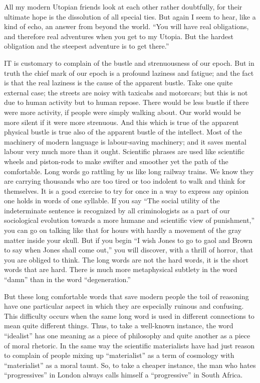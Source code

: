 All my modern Utopian friends look at each other rather doubtfully, for their ultimate hope is the dissolution of all special ties. But again I seem to hear, like a kind of echo, an answer from beyond the world. “You will have real obligations, and therefore real adventures when you get to my Utopia. But the hardest obligation and the steepest adventure is to get there.”


IT is customary to complain of the bustle and strenuousness of our epoch. But in truth the chief mark of our epoch is a profound laziness and fatigue; and the fact is that the real laziness is the cause of the apparent bustle. Take one quite external case; the streets are noisy with taxicabs and motorcars; but this is not due to human activity but to human repose. There would be less bustle if there were more activity, if people were simply walking about. Our world would be more silent if it were more strenuous. And this which is true of the apparent physical bustle is true also of the apparent bustle of the intellect. Most of the machinery of modern language is labour-saving machinery; and it saves mental labour very much more than it ought. Scientific phrases are used like scientific wheels and piston-rods to make swifter and smoother yet the path of the comfortable. Long words go rattling by us like long railway trains. We know they are carrying thousands who are too tired or too indolent to walk and think for themselves. It is a good exercise to try for once in a way to express any opinion one holds in words of one syllable. If you say “The social utility of the indeterminate sentence is recognized by all criminologists as a part of our sociological evolution towards a more humane and scientific view of punishment,” you can go on talking like that for hours with hardly a movement of the gray matter inside your skull. But if you begin “I wish Jones to go to gaol and Brown to say when Jones shall come out,” you will discover, with a thrill of horror, that you are obliged to think. The long words are not the hard words, it is the short words that are hard. There is much more metaphysical subtlety in the word “damn” than in the word “degeneration.”

But these long comfortable words that save modern people the toil of reasoning have one particular aspect in which they are especially ruinous and confusing. This difficulty occurs when the same long word is used in different connections to mean quite different things. Thus, to take a well-known instance, the word “idealist” has one meaning as a piece of philosophy and quite another as a piece of moral rhetoric. In the same way the scientific materialists have had just reason to complain of people mixing up “materialist” as a term of cosmology with “materialist” as a moral taunt. So, to take a cheaper instance, the man who hates “progressives” in London always calls himself a “progressive” in South Africa.

